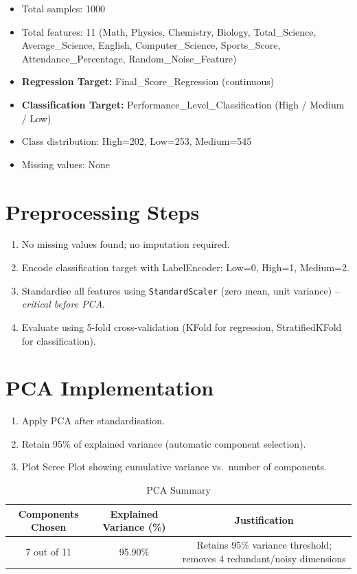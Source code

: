 \documentclass[11pt]{article}
\begin{document}
\begin{itemize}
    \item Total samples: 1000
    \item Total features: 11 (Math, Physics, Chemistry, Biology, Total\_Science, Average\_Science, English, Computer\_Science, Sports\_Score, Attendance\_Percentage, Random\_Noise\_Feature)
    \item \textbf{Regression Target:} Final\_Score\_Regression (continuous)
    \item \textbf{Classification Target:} Performance\_Level\_Classification (High / Medium / Low)
    \item Class distribution: High=202, Low=253, Medium=545
    \item Missing values: None
\end{itemize}

\section*{Preprocessing Steps}
\begin{enumerate}
    \item No missing values found; no imputation required.
    \item Encode classification target with LabelEncoder: Low=0, High=1, Medium=2.
    \item Standardise all features using \texttt{StandardScaler} (zero mean, unit variance) -- \emph{critical before PCA}.
    \item Evaluate using 5-fold cross-validation (KFold for regression, StratifiedKFold for classification).
\end{enumerate}

\section*{PCA Implementation}

\begin{enumerate}
    \item Apply PCA after standardisation.
    \item Retain 95\% of explained variance (automatic component selection).
    \item Plot Scree Plot showing cumulative variance vs.\ number of components.
\end{enumerate}

\begin{table}[H]
\centering
\caption{PCA Summary}
\begin{tabular}{|c|c|c|}
\hline
Components Chosen & Explained Variance (\%) & Justification \\
\hline
7 out of 11 & 95.90\% & Retains 95\% variance threshold; removes 4 redundant/noisy dimensions \\
\hline
\end{tabular}
\end{table}
\end{document}

